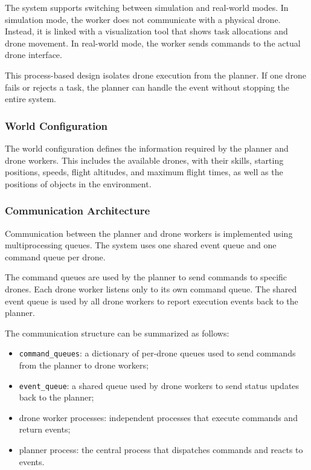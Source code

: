 The system supports switching between simulation and real-world modes.
In simulation mode, the worker does not communicate with a physical drone. 
Instead, it is linked with a visualization tool that shows task allocations and drone movement.
In real-world mode, the worker sends commands to the actual drone interface.

This process-based design isolates drone execution from the planner.
If one drone fails or rejects a task, the planner can handle the event without stopping the entire system.

\subsubsection{World Configuration}

The world configuration defines the information required by the planner and drone workers.
This includes the available drones, with their skills, starting positions, speeds, flight altitudes, and maximum flight times, 
as well as the positions of objects in the environment.

\subsubsection{Communication Architecture}

Communication between the planner and drone workers is implemented using multiprocessing queues. 
The system uses one shared event queue and one command queue per drone.

The command queues are used by the planner to send commands to specific drones. 
Each drone worker listens only to its own command queue. 
The shared event queue is used by all drone workers to report execution events back to the planner.

The communication structure can be summarized as follows:

\begin{itemize}
    \item \texttt{command\_queues}: a dictionary of per-drone queues used to send commands from the planner to drone workers;
    \item \texttt{event\_queue}: a shared queue used by drone workers to send status updates back to the planner;
    \item drone worker processes: independent processes that execute commands and return events;
    \item planner process: the central process that dispatches commands and reacts to events.
\end{itemize}

